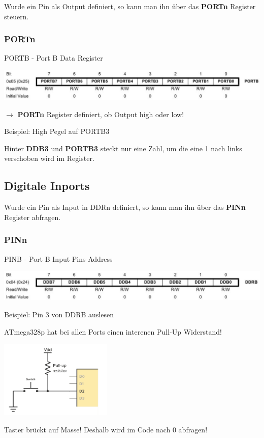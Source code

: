 \documentclass[11pt, a4paper]{scrartcl}
\begin{document}
Wurde ein Pin als Output definiert, so kann man ihn über das \textbf{PORTn} Register steuern.

\subsubsection{PORTn}

PORTB - Port B Data Register

\includegraphics[width=1\textwidth]{01/02.png}

\vspace{2em} 

$\rightarrow$ \textbf{PORTn} Register definiert, ob Output high oder low!

\vspace{3em} 

Beispiel: High Pegel auf PORTB3


Hinter \textbf{DDB3} und \textbf{PORTB3} steckt nur eine Zahl, um die eine 1 nach links verschoben wird im Register.

\newpage



\subsection{Digitale Inports}

Wurde ein Pin als Input in DDRn definiert, so kann man ihn über das \textbf{PINn} Register abfragen.

\subsubsection{PINn}

PINB - Port B Input Pins Address

\includegraphics[width=1\textwidth]{01/03.png}

\vspace{2em} 

Beispiel: Pin 3 von DDRB auslesen


\vspace{1em} 

ATmega328p hat bei allen Ports einen interenen Pull-Up Widerstand!

\includegraphics[width=0.4\textwidth]{01/04.png} 

Taster brückt auf Masse! Deshalb wird im Code nach 0 abfragen!

\vspace{1em}

\newpage
\end{document}
